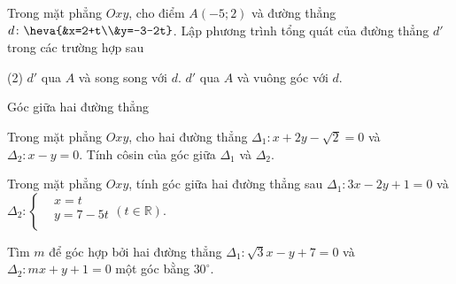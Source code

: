 \begin{vd}
	Trong mặt phẳng $Oxy$, cho điểm $A(-5;2)$ và đường thẳng $ d \colon \heva{&x=2+t\\&y=-3-2t}$. Lập phương trình tổng quát của đường thẳng $ d'$ trong các trường hợp sau
	\begin{tasks}(2)
		\task $d'$ qua $ A $ và song song với $d.$
		\task $d'$ qua $A$ và vuông góc với $d.$ 
	\end{tasks}
	\loigiai{
	}
\end{vd}
\begin{dang}{Góc giữa hai đường thẳng}
\end{dang}

\begin{vd}
	Trong mặt phẳng $Oxy$, cho hai đường thẳng $\Delta_1:x+2y-\sqrt{2}=0$ và $\Delta_2:x-y=0$. Tính côsin của góc giữa $\Delta_1$ và $\Delta_2$.
\end{vd}


\begin{vd}
	Trong mặt phẳng $Oxy$, tính góc giữa hai đường thẳng sau $ \Delta_1\colon 3x-2y+1=0$ và $ \Delta_2\colon \left\{\begin{aligned}& x=t \\ & y=7-5t \\ \end{aligned}\right. \left(t\in \mathbb{R}\right)$.
\end{vd}

\begin{vd}
	Tìm $m$ để góc hợp bởi hai đường thẳng $ \Delta_1\colon \sqrt{3}x-y+7=0$ và $ \Delta_2\colon mx+y+1=0$ một góc bằng $30^{\circ}$. 
\end{vd}

